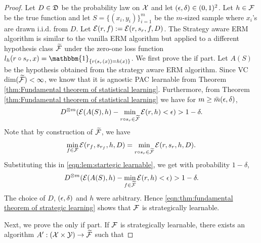 \begin{proof}
Let  $D \in \mathfrak{D}$ be the probability law on $\mathcal{X}$ and let $(\epsilon,\delta) \in (0,1)^2$. Let $h \in \mathcal{F}$ be the true function and let $S = \{(x_i,y_i)\}_{i=1}^m$ be the $m$-sized sample where $x_i$'s are drawn i.i.d. from $D$. Let $\mathcal{E}(r,f) := \mathcal{E}(r,s_r,f,D)$. The Strategy aware ERM algorithm is similar to the vanilla ERM algorithm but applied to a different hypothesis class $\widetilde{\mathcal{F}}$ under the zero-one loss function $
		l_h(r \circ s_r, x) = \mathbbm{1}_{\{r(s_r(x)) = h(x)\}}$.
	We first prove the if part.
    Let $A(S)$ be the hypothesis obtained from the strategy aware ERM algorithm. Since VC dim$(\widetilde{\mathcal{F}}) < \infty$, we know that it is agnostic PAC learnable from Theorem \ref{thm:Fundamental theorem of statistical learning}. Furthermore, from Theorem \ref{thm:Fundamental theorem of statistical learning} we have for $m \geq \bar{m}(\epsilon,\delta)$,
	\begin{equation}\label{eqn:lem:startegic learnable}
	   \begin{aligned}
			D^{\otimes m}(\mathcal{E}(A(S), h) - \min_{r \circ s_r \in \widetilde{\mathcal{F}}} \mathcal{E}(r, h) < \epsilon) > 1 - \delta.
		\end{aligned}
	\end{equation}
	Note that by construction of $\widetilde{\mathcal{F}}$, we have
	\[
		\min_{f \in \mathcal{F}} \mathcal{E}(r_f, s_{r_f}, h, D) = \min_{r \circ s_r \in \widetilde{\mathcal{F}}} \mathcal{E}(r, s_r, h, D).
	\]
	Substituting this in \eqref{eqn:lem:startegic learnable}, we get with probability $1 - \delta$,
    \begin{equation}\label{eqn:thm:fundamental theorem of strategic learning}
        \begin{aligned}
            D^{\otimes m}(\mathcal{E}(A(S), h) - \min_{f \in \widetilde{\mathcal{F}}} \mathcal{E}(r, h) < \epsilon) > 1 - \delta.
        \end{aligned}
    \end{equation}
The choice of $D$, $(\epsilon,\delta)$ and $h$ were arbitrary. Hence \eqref{eqn:thm:fundamental theorem of strategic learning}
shows that $\mathcal{F}$ is strategically learnable.

\noindent Next, we prove the only if part. If $\mathcal{F}$ is strategically learnable, there exists an algorithm $A': (\mathcal{X} \times \mathcal{Y}) \rightarrow \widetilde{\mathcal{F}}$ such that 


\end{proof}
